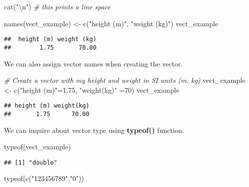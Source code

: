 \documentclass[
]{article}
\newenvironment{Shaded}{\begin{snugshade}}{\end{snugshade}}
\newcommand{\CommentTok}[1]{\textcolor[rgb]{0.56,0.35,0.01}{\textit{#1}}}
\newcommand{\DecValTok}[1]{\textcolor[rgb]{0.00,0.00,0.81}{#1}}
\newcommand{\FloatTok}[1]{\textcolor[rgb]{0.00,0.00,0.81}{#1}}
\newcommand{\FunctionTok}[1]{\textcolor[rgb]{0.00,0.00,0.00}{#1}}
\newcommand{\NormalTok}[1]{#1}
\newcommand{\OtherTok}[1]{\textcolor[rgb]{0.56,0.35,0.01}{#1}}
\newcommand{\SpecialCharTok}[1]{\textcolor[rgb]{0.00,0.00,0.00}{#1}}
\newcommand{\StringTok}[1]{\textcolor[rgb]{0.31,0.60,0.02}{#1}}
\begin{document}
\begin{Shaded}
\begin{Highlighting}[]
\FunctionTok{cat}\NormalTok{(}\StringTok{"}\SpecialCharTok{\textbackslash{}n}\StringTok{"}\NormalTok{)   }\CommentTok{\# this prints a line space}
\end{Highlighting}
\end{Shaded}

\begin{Shaded}
\begin{Highlighting}[]
\FunctionTok{names}\NormalTok{(vect\_example) }\OtherTok{\textless{}{-}} \FunctionTok{c}\NormalTok{(}\StringTok{"height (m)"}\NormalTok{, }\StringTok{"weight (kg)"}\NormalTok{)}
\NormalTok{vect\_example}
\end{Highlighting}
\end{Shaded}

\begin{verbatim}
##  height (m) weight (kg) 
##        1.75       70.00
\end{verbatim}

We can also assign vector names when creating the vector.

\begin{Shaded}
\begin{Highlighting}[]
\CommentTok{\# Create a vector with my height and weight in SI units (m, kg)}
\NormalTok{vect\_example }\OtherTok{\textless{}{-}} \FunctionTok{c}\NormalTok{(}\StringTok{"height (m)"}\OtherTok{=}\FloatTok{1.75}\NormalTok{, }\StringTok{"weight(kg)"} \OtherTok{=}\DecValTok{70}\NormalTok{)}
\NormalTok{vect\_example}
\end{Highlighting}
\end{Shaded}

\begin{verbatim}
## height (m) weight(kg) 
##       1.75      70.00
\end{verbatim}

We can inquire about vector type using \textbf{typeof()} function.

\begin{Shaded}
\begin{Highlighting}[]
\FunctionTok{typeof}\NormalTok{(vect\_example)}
\end{Highlighting}
\end{Shaded}

\begin{verbatim}
## [1] "double"
\end{verbatim}

\begin{Shaded}
\begin{Highlighting}[]
\FunctionTok{typeof}\NormalTok{(}\FunctionTok{c}\NormalTok{(}\StringTok{"123456789"}\NormalTok{,}\StringTok{"0"}\NormalTok{))}
\end{Highlighting}
\end{Shaded}
\end{document}
